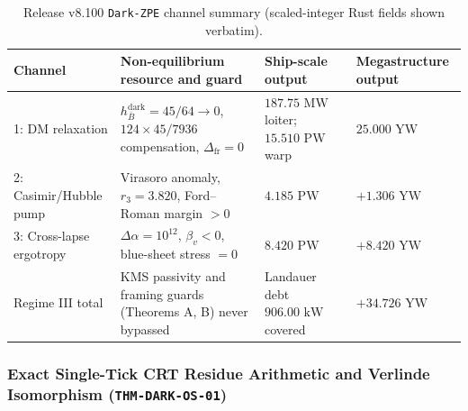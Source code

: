\documentclass[11pt,onecolumn]{article}
\begin{document}
\begin{table}[!htbp]
\centering\small
\caption{Release v8.100 \texttt{Dark-ZPE} channel summary (scaled-integer Rust fields shown verbatim).}
\label{tab:v8_dark_zpe_channels}
\begin{tabularx}{\textwidth}{@{}p{3.2cm} X p{3.6cm} p{3.6cm}@{}}
\toprule
Channel & Non-equilibrium resource and guard & Ship-scale output & Megastructure output \\
\midrule
1: DM relaxation & $h_{\bar B}^{\text{dark}}=45/64\to0$, $124\times45/7936$ compensation, $\Delta_{\text{fr}}=0$ & $187.75\text{ MW}$ loiter; $15.510\text{ PW}$ warp & $25.000\text{ YW}$ \\
2: Casimir/Hubble pump & Virasoro anomaly, $r_3=3.820$, Ford--Roman margin $>0$ & $4.185\text{ PW}$ & $+1.306\text{ YW}$ \\
3: Cross-lapse ergotropy & $\Delta\alpha=10^{12}$, $\beta_v<0$, blue-sheet stress $=0$ & $8.420\text{ PW}$ & $+8.420\text{ YW}$ \\
\midrule
Regime III total & KMS passivity and framing guards (Theorems A, B) never bypassed & Landauer debt $906.00\text{ kW}$ covered & $+34.726\text{ YW}$ \\
\bottomrule
\end{tabularx}
\end{table}

\subsubsection{Exact Single-Tick CRT Residue Arithmetic and Verlinde Isomorphism (\texttt{THM-DARK-OS-01})}
\label{subsubsec:thm_dark_os_01}
\end{document}
